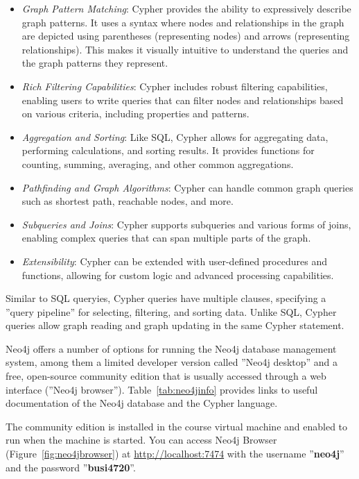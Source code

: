 \begin{itemize}
\item \emph{Graph Pattern Matching}: Cypher provides the ability to expressively describe graph patterns. It uses a syntax where nodes and relationships in the graph are depicted using parentheses (representing nodes) and arrows (representing relationships). This makes it visually intuitive to understand the queries and the graph patterns they represent.

\item \emph{Rich Filtering Capabilities}: Cypher includes robust filtering capabilities, enabling users to write queries that can filter nodes and relationships based on various criteria, including properties and patterns.

\item \emph{Aggregation and Sorting}: Like SQL, Cypher allows for aggregating data, performing calculations, and sorting results. It provides functions for counting, summing, averaging, and other common aggregations.

\item \emph{Pathfinding and Graph Algorithms}: Cypher can handle common graph queries such as shortest path, reachable nodes, and more.

\item \emph{Subqueries and Joins}: Cypher supports subqueries and various forms of joins, enabling complex queries that can span multiple parts of the graph.

\item \emph{Extensibility}: Cypher can be extended with user-defined procedures and functions, allowing for custom logic and advanced processing capabilities.
\end{itemize}

Similar to SQL queryies, Cypher queries have multiple clauses, specifying a ''query pipeline'' for selecting, filtering, and sorting data. Unlike SQL, Cypher queries allow graph reading and graph updating in the same Cypher statement. 

Neo4j offers a number of options for running the Neo4j database management system, among them a limited developer version called ''Neo4j desktop'' and a free, open-source community edition that is usually accessed through a web interface (''Neo4j browser''). Table~\ref{tab:neo4jinfo} provides links to useful documentation of the Neo4j database and the Cypher language.

\begin{tcolorbox}[colback=alert]
The community edition is installed in the course virtual machine and enabled to run when the machine is started. You can access Neo4j Browser (Figure~\ref{fig:neo4jbrowser}) at \url{http://localhost:7474} with the username ''\textbf{neo4j}'' and the password ''\textbf{busi4720}''. 
\end{tcolorbox}

